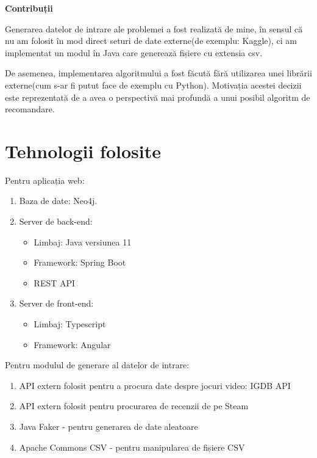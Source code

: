 \documentclass[12pt,a4paper]{report}
\begin{document}
\bigskip
\textbf{Contribuții}
\bigskip  

Generarea datelor de intrare ale problemei a fost realizată de mine, în sensul că nu am folosit în mod direct seturi de date externe(de exemplu: Kaggle), ci am implementat un modul în Java care generează fișiere cu extensia csv.

De asemenea, implementarea algoritmului a fost făcută fără utilizarea unei librării externe(cum s-ar fi putut face de exemplu cu Python). Motivația acestei decizii este reprezentată de a avea o perspectivă mai profundă a unui posibil algoritm de recomandare.

\section{Tehnologii folosite}

Pentru aplicația web:

\begin{enumerate}
  \item Baza de date: Neo4j.
  \item Server de back-end:
  \begin{itemize}
     \item Limbaj: Java versiunea 11
     \item Framework: Spring Boot
     \item REST API
   \end{itemize}
  \item Server de front-end:
  \begin{itemize}
     \item Limbaj: Typescript
     \item Framework: Angular
   \end{itemize}
\end{enumerate}
Pentru modulul de generare al datelor de intrare:

\begin{enumerate}
  \item API extern folosit pentru a procura date despre jocuri video: IGDB API \cite{1}
  \item API extern folosit pentru procurarea de recenzii de pe Steam \cite{2}
  \item Java Faker - pentru generarea de date aleatoare \cite{3}
  \item Apache Commons CSV - pentru manipularea de fișiere CSV \cite{4}
\end{enumerate}

\newpage
\end{document}
